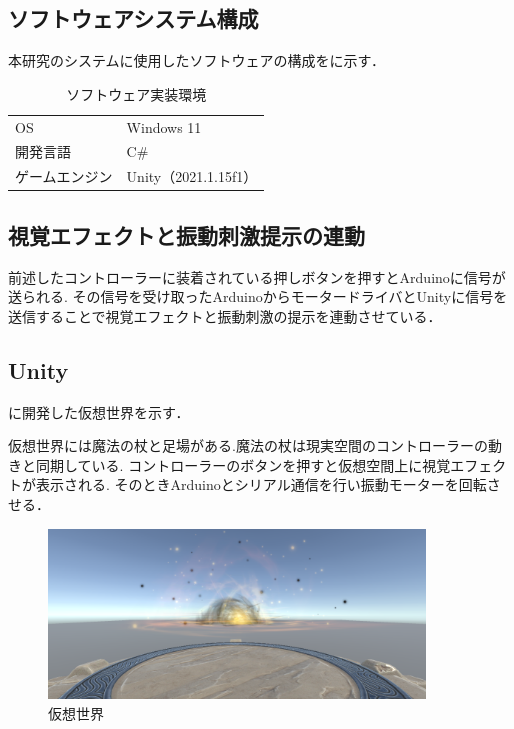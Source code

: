 \subsection{ソフトウェアシステム構成}
本研究のシステムに使用したソフトウェアの構成をに示す．

\begin{table}[H]
    \caption{\label{tab;software}ソフトウェア実装環境}
    \centering
    \begin{tabular}{l|l}
    \hline
    \hline
    OS & Windows 11\\
    開発言語 & C\#\\
    ゲームエンジン & Unity（2021.1.15f1）\\
    \hline
    \end{tabular}
\end{table}

\subsection{視覚エフェクトと振動刺激提示の連動}
前述したコントローラーに装着されている押しボタンを押すとArduinoに信号が送られる.
その信号を受け取ったArduinoからモータードライバとUnityに信号を送信することで視覚エフェクトと振動刺激の提示を連動させている．

\subsection{Unity}
に開発した仮想世界を示す．

仮想世界には魔法の杖と足場がある.魔法の杖は現実空間のコントローラーの動きと同期している.
コントローラーのボタンを押すと仮想空間上に視覚エフェクトが表示される.
そのときArduinoとシリアル通信を行い振動モーターを回転させる．

\begin{figure}[h]
\centering
\includegraphics[clip,width=10cm]{fig/unity.png}
\caption{仮想世界}\label{virtualworld}
\end{figure}